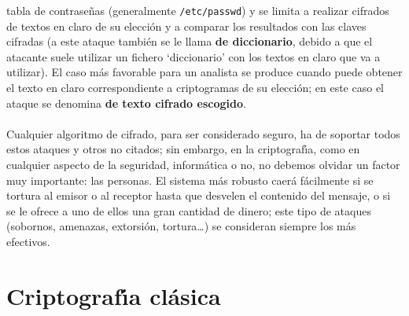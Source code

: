 tabla de contrase\~nas (generalmente {\tt /etc/passwd}) y se limita a realizar
cifrados de textos en claro de su elecci\'on y a comparar los resultados con 
las claves cifradas (a este ataque tambi\'en se le llama {\bf de 
diccionario}, debido a que el atacante suele utilizar un fichero `diccionario' 
con los textos en claro que va a utilizar).  El caso m\'as favorable para un 
analista se produce cuando puede 
obtener el texto en claro correspondiente a criptogramas de su elecci\'on; en 
este caso el ataque se denomina {\bf de texto cifrado escogido}.\\
\\Cualquier algoritmo
de cifrado, para ser considerado seguro, ha de soportar todos estos ataques 
y otros no citados; sin embargo, en la criptograf\'{\i}a, como en cualquier 
aspecto de la seguridad, inform\'atica o no, no debemos olvidar un factor muy 
importante: las personas. El sistema m\'as robusto caer\'a f\'acilmente si se 
tortura al emisor o al receptor hasta que desvelen el contenido del mensaje, o 
si se le ofrece a uno de ellos una gran cantidad de dinero; este tipo de 
ataques (sobornos, amenazas, extorsi\'on, tortura\ldots) se consideran siempre 
los m\'as efectivos.\\
\section{Criptograf\'{\i}a cl\'asica}
